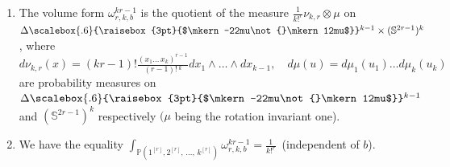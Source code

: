 \documentclass[AHL,Unicode,longabstracts,published]{cedram}
\newcommand*\bP{\mathbb{P}}
\newcommand*\bS{\mathbb{S}}
\newcommand\bDel{\mbox{$\Delta$\newline \scalebox{.6}{\raisebox{3pt}{$\mkern-22mu\not{}\mkern12mu$}}}}
\newcommand\bDelta{\mathchoice{\bDel}{\bDel}{\scalebox{.7}{\bDel}}{\scalebox{.5}{\bDel}}}
\newcommand*{\alphenumi}{\renewcommand*{\theenumi}{\alph{enumi}}}
\begin{document}
\begin{prop}
\leavevmode\label{prop:volume_form}
\begin{enumerate}\alphenumi
\item\label{prop4.3.a} The volume form $\omega_{r,k,b}^{kr-1}$ is the quotient of the measure $\tfrac{1}{ k!^r}\nu_{k,r}\otimes\mu$ on $\bDelta^{k-1}\times(\bS^{2r-1})^k$, where
\[
d\nu_{k,r}(x)=(kr-1)!\tfrac{(x_1\ldots\,x_k) ^{r-1}}{ (r-1)!\,{}^k} dx_1\wedge\ldots\wedge dx_{k-1},\quad d\mu(u)=d\mu_1(u_1)\ldots d\mu_k(u_k)
\]
are probability measures on $\bDelta^{k-1}$ and $(\bS^{2r-1})^k$ respectively
$(\mu$ being the rotation inva\-riant one).
\item\label{prop4.3.b} We have the equality
$\int_{\bP(1^{[r]},2^{[r]},\,\dotsc,\,k^{[r]})}\omega_{r,k,b}^{kr-1}=\tfrac{1}{ k!^r}$~(independent of $b$).
\end{enumerate}
\end{prop}
\end{document}
